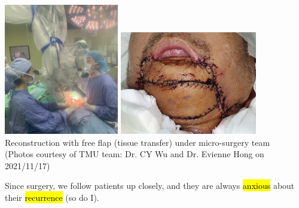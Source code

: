 \documentclass[
paper=landscape,
paper=160mm:90mm, %
fontsize=11pt, %
pagesize, %
parskip=half-, %
]{scrartcl} %
\theoremstyle{mythmstyle} %
\begin{document}
\includegraphics[width=5cm]{IMG_6791.jpg}
\includegraphics[width=6cm]{IMG_6910.jpg}\\
\large Reconstruction with free flap (tissue transfer) under micro-surgery team\\
{\tiny (Photos courtesy of TMU team: Dr. CY Wu and Dr. Evienne Hong on 2021/11/17)}

\clearpage
\thispagestyle{headings}

\large Since surgery, we follow patients up closely, and they are always \hl{anxious} about their \hl{recurrence} (so do I).\vspace{5mm}
\end{document}
